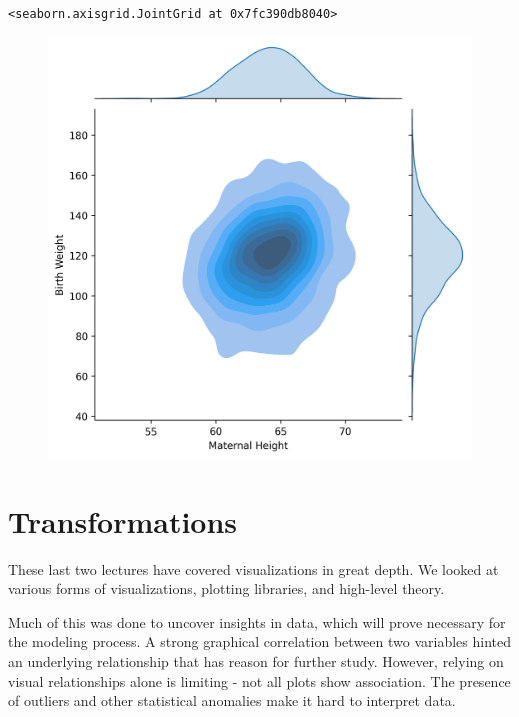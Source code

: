 \documentclass[
  letterpaper,
  DIV=11,
  numbers=noendperiod]{scrreprt}
\begin{document}
\begin{verbatim}
<seaborn.axisgrid.JointGrid at 0x7fc390db8040>
\end{verbatim}

\begin{figure}[H]

{\centering \includegraphics{visualization_2/visualization_2_files/figure-pdf/cell-12-output-2.png}

}

\end{figure}

\hypertarget{transformations}{%
\section{Transformations}\label{transformations}}

These last two lectures have covered visualizations in great depth. We
looked at various forms of visualizations, plotting libraries, and
high-level theory.

Much of this was done to uncover insights in data, which will prove
necessary for the modeling process. A strong graphical correlation
between two variables hinted an underlying relationship that has reason
for further study. However, relying on visual relationships alone is
limiting - not all plots show association. The presence of outliers and
other statistical anomalies make it hard to interpret data.
\end{document}
